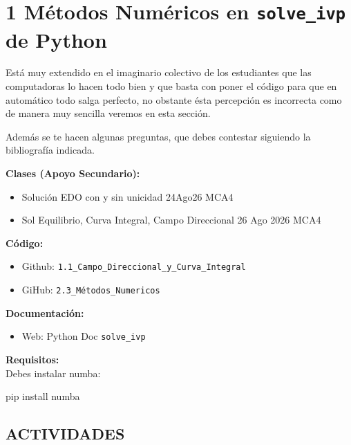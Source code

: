 \section{1 Métodos Numéricos en \texttt{solve\_ivp} de Python}

\begin{tcolorbox}[enunciado]
Está muy extendido en el imaginario colectivo de los estudiantes que las computadoras lo hacen todo bien y que basta con poner el código para que en automático todo salga perfecto, no obstante ésta percepción es incorrecta como de manera muy sencilla veremos en esta sección.

Además se te hacen algunas preguntas, que debes contestar siguiendo la bibliografía indicada.

\vspace{0.2cm}
\textbf{Clases (Apoyo Secundario):}
\begin{itemize}[leftmargin=*]
    \item Solución EDO con y sin unicidad 24Ago26 MCA4
    \item Sol Equilibrio, Curva Integral, Campo Direccional 26 Ago 2026 MCA4
\end{itemize}

\textbf{Código:}
\begin{itemize}[leftmargin=*]
    \item Github: \texttt{1.1\_Campo\_Direccional\_y\_Curva\_Integral}
    \item GiHub: \texttt{2.3\_Métodos\_Numericos}
\end{itemize}

\textbf{Documentación:}
\begin{itemize}[leftmargin=*]
    \item Web: Python Doc \texttt{solve\_ivp}
\end{itemize}

\textbf{Requisitos:} \\
Debes instalar numba:
\begin{terminal}
pip install numba
\end{terminal}
\end{tcolorbox}

\subsection*{ACTIVIDADES}

